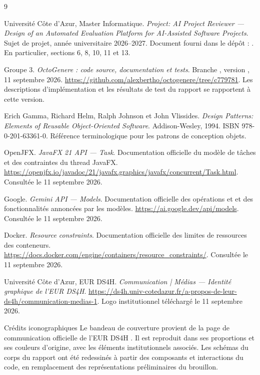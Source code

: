 \clearpage
\renewcommand{\refname}{Références}
\begin{thebibliography}{9}
\raggedright
\setlength{\itemsep}{11pt}
Université Côte d'Azur, Master Informatique.
\emph{Project: AI Project Reviewer — Design of an Automated Evaluation Platform for AI-Assisted Software Projects}.
Sujet de projet, année universitaire 2026–2027.
Document fourni dans le dépôt : . En particulier, sections 6, 8, 10, 11 et 13.

Groupe 3. \emph{OctoGenere : code source, documentation et tests}.
Branche , version , 11 septembre 2026.
\url{https://github.com/alexbertho/octogenere/tree/c779781}.
Les descriptions d'implémentation et les résultats de test du rapport se rapportent à cette version.

Erich Gamma, Richard Helm, Ralph Johnson et John Vlissides.
\emph{Design Patterns: Elements of Reusable Object-Oriented Software}.
Addison-Wesley, 1994. ISBN 978-0-201-63361-0.
Référence terminologique pour les patrons de conception objets.

OpenJFX. \emph{JavaFX 21 API — Task}.
Documentation officielle du modèle de tâches et des contraintes du thread JavaFX.
\url{https://openjfx.io/javadoc/21/javafx.graphics/javafx/concurrent/Task.html}.
Consultée le 11 septembre 2026.

Google. \emph{Gemini API — Models}.
Documentation officielle des opérations  et  et des fonctionnalités annoncées par les modèles.
\url{https://ai.google.dev/api/models}.
Consultée le 11 septembre 2026.

Docker. \emph{Resource constraints}.
Documentation officielle des limites de ressources des conteneurs.
\url{https://docs.docker.com/engine/containers/resource_constraints/}.
Consultée le 11 septembre 2026.

Université Côte d'Azur, EUR DS4H.
\emph{Communication | Médias — Identité graphique de l'EUR DS4H}.
\url{https://ds4h.univ-cotedazur.fr/a-propos-de-leur-ds4h/communication-medias-1}.
Logo institutionnel téléchargé le 11 septembre 2026.
\end{thebibliography}

\vfill
\begin{pointcle}{Crédits iconographiques}
Le bandeau de couverture provient de la page de communication officielle de l'EUR DS4H \cite{ds4h}. Il est reproduit dans ses proportions et ses couleurs d'origine, avec les éléments institutionnels associés. Les schémas du corps du rapport ont été redessinés à partir des composants et interactions du code, en remplacement des représentations préliminaires du brouillon.
\end{pointcle}
